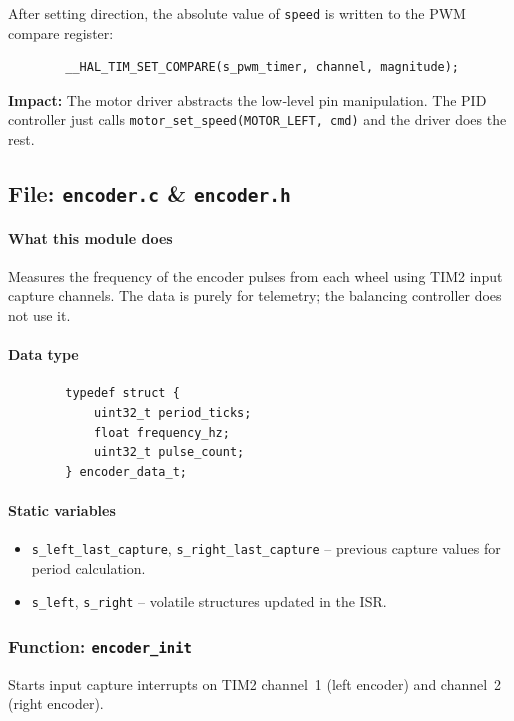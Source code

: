 \documentclass[12pt,a4paper]{article}
\newcommand{\file}[1]{\texttt{#1}}
\newcommand{\func}[1]{\texttt{#1}}
\begin{document}
	After setting direction, the absolute value of \texttt{speed} is written to the PWM compare register:
	\begin{lstlisting}
		__HAL_TIM_SET_COMPARE(s_pwm_timer, channel, magnitude);
	\end{lstlisting}
	\textbf{Impact:} The motor driver abstracts the low‑level pin manipulation. The PID controller just calls \texttt{motor\_set\_speed(MOTOR\_LEFT, cmd)} and the driver does the rest.
	
	\subsection{File: \file{encoder.c} \& \file{encoder.h}}
	\label{subsec:encoder}
	\paragraph*{What this module does}
	Measures the frequency of the encoder pulses from each wheel using TIM2 input capture channels. The data is purely for telemetry; the balancing controller does not use it.
	
	\paragraph*{Data type}
	\begin{lstlisting}
		typedef struct {
			uint32_t period_ticks;
			float frequency_hz;
			uint32_t pulse_count;
		} encoder_data_t;
	\end{lstlisting}
	
	\paragraph*{Static variables}
	\begin{itemize}
		\item \texttt{s\_left\_last\_capture}, \texttt{s\_right\_last\_capture} -- previous capture values for period calculation.
		\item \texttt{s\_left}, \texttt{s\_right} -- volatile structures updated in the ISR.
	\end{itemize}
	
	\subsubsection*{Function: \func{encoder\_init}}
	Starts input capture interrupts on TIM2 channel~1 (left encoder) and channel~2 (right encoder).
	
\end{document}

